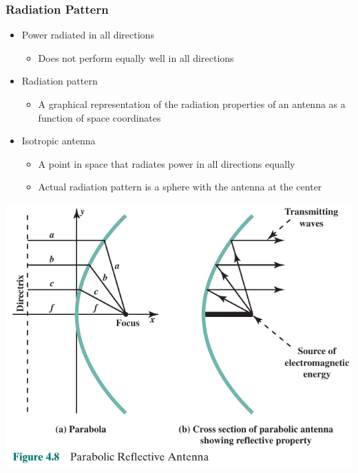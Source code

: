 \documentclass[pdflatex,compress]{beamer}
\begin{document}
\begin{frame}
	\frametitle{Radiation Pattern}
	\begin{itemize}
		\item Power radiated in all directions
		\begin{itemize}
			\item Does not perform equally well in all directions
		\end{itemize}
		\item Radiation pattern
		\begin{itemize}
			\item A graphical representation of the radiation properties of an antenna as a function of space coordinates
		\end{itemize}
		\item Isotropic antenna
		\begin{itemize}
			\item A point in space that radiates power in all directions equally
			\item Actual radiation pattern is a sphere with the antenna at the center
		\end{itemize}
	\end{itemize}
\end{frame}

\begin{frame}
	\begin{center}
		\includegraphics[height=0.9\textheight]{img/img18}
	\end{center}
\end{frame}
\end{document}
